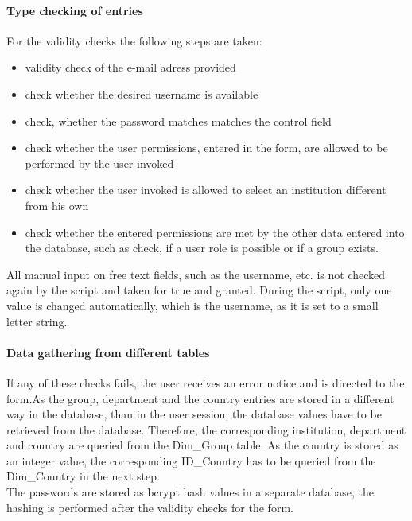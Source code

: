 \paragraph{Type checking of entries}
For the validity checks the following steps are taken:
\begin{itemize}
 \item validity check of the e-mail adress provided
 \item check whether the desired username is available
 \item check, whether the password matches matches the control field
 \item check whether the user permissions, entered in the form, are allowed to be performed by the user invoked
 \item check whether the user invoked is allowed to select an institution different from his own
 \item check whether the entered permissions are met by the other data entered into the database, such as check, if a user role is possible or if a group exists.
\end{itemize}
All manual input on free text fields, such as the username, etc. is not checked again by the script and taken for true and granted. During the script, only one value is changed 
automatically, which is the username, as it is set to a small letter string.
\paragraph{Data gathering from different tables}
If any of these checks fails, the user receives an error notice and is directed to the form.As the group, department and the country entries are stored in a different
way in the database, than in the user session, the database values have to be retrieved from the database. Therefore, the corresponding institution, department and country are 
queried from the Dim\_Group table. As the country is stored as an integer value, the corresponding ID\_Country has to be queried from the Dim\_Country in the next step.\\
The passwords are stored as bcrypt hash values in a separate database, the hashing is performed after the validity checks for the form. 
